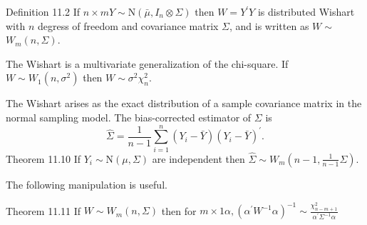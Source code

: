 \documentclass[10pt]{article}
\begin{document}
Definition 11.2 If $n \times m Y \sim \mathrm{N}\left(\bar{\mu}, I_{n} \otimes \Sigma\right)$ then $W=Y^{\prime} Y$ is distributed Wishart with $n$ degress of freedom and covariance matrix $\Sigma$, and is written as $W \sim$ $W_{m}(n, \Sigma)$.

The Wishart is a multivariate generalization of the chi-square. If $W \sim W_{1}\left(n, \sigma^{2}\right)$ then $W \sim \sigma^{2} \chi_{n}^{2}$.

The Wishart arises as the exact distribution of a sample covariance matrix in the normal sampling model. The bias-corrected estimator of $\Sigma$ is
$$
\widehat{\Sigma}=\frac{1}{n-1} \sum_{i=1}^{n}\left(Y_{i}-\bar{Y}\right)\left(Y_{i}-\bar{Y}\right)^{\prime} .
$$
Theorem 11.10 If $Y_{i} \sim \mathrm{N}(\mu, \Sigma)$ are independent then $\widehat{\Sigma} \sim W_{m}\left(n-1, \frac{1}{n-1} \Sigma\right)$.

The following manipulation is useful.

Theorem 11.11 If $W \sim W_{m}(n, \Sigma)$ then for $m \times 1 \alpha,\left(\alpha^{\prime} W^{-1} \alpha\right)^{-1} \sim \frac{\chi_{n-m+1}^{2}}{\alpha^{\prime} \Sigma^{-1} \alpha}$
\end{document}
